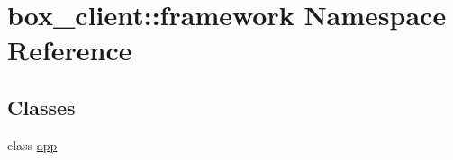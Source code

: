 \hypertarget{namespacebox__client_1_1framework}{
\section{box\_\-client::framework Namespace Reference}
\label{namespacebox__client_1_1framework}
}
\subsection*{Classes}
\begin{DoxyCompactItemize}
\item 
class \hyperlink{classbox__client_1_1framework_1_1app}{app}
\end{DoxyCompactItemize}
